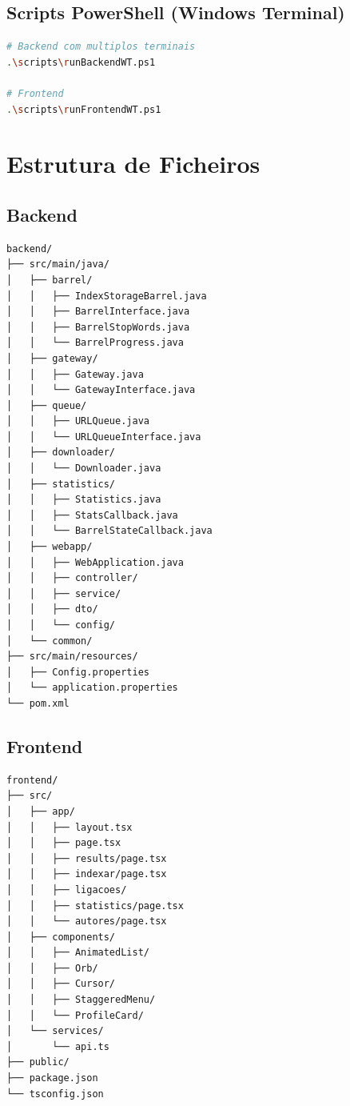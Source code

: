\documentclass[12pt,a4paper]{article}
\begin{document}
\subsection{Scripts PowerShell (Windows Terminal)}
\begin{lstlisting}[language=bash]
# Backend com multiplos terminais
.\scripts\runBackendWT.ps1

# Frontend
.\scripts\runFrontendWT.ps1
\end{lstlisting}

\section{Estrutura de Ficheiros}

\subsection{Backend}
\begin{lstlisting}
backend/
├── src/main/java/
│   ├── barrel/
│   │   ├── IndexStorageBarrel.java
│   │   ├── BarrelInterface.java
│   │   ├── BarrelStopWords.java
│   │   └── BarrelProgress.java
│   ├── gateway/
│   │   ├── Gateway.java
│   │   └── GatewayInterface.java
│   ├── queue/
│   │   ├── URLQueue.java
│   │   └── URLQueueInterface.java
│   ├── downloader/
│   │   └── Downloader.java
│   ├── statistics/
│   │   ├── Statistics.java
│   │   ├── StatsCallback.java
│   │   └── BarrelStateCallback.java
│   ├── webapp/
│   │   ├── WebApplication.java
│   │   ├── controller/
│   │   ├── service/
│   │   ├── dto/
│   │   └── config/
│   └── common/
├── src/main/resources/
│   ├── Config.properties
│   └── application.properties
└── pom.xml
\end{lstlisting}

\subsection{Frontend}
\begin{lstlisting}
frontend/
├── src/
│   ├── app/
│   │   ├── layout.tsx
│   │   ├── page.tsx
│   │   ├── results/page.tsx
│   │   ├── indexar/page.tsx
│   │   ├── ligacoes/
│   │   ├── statistics/page.tsx
│   │   └── autores/page.tsx
│   ├── components/
│   │   ├── AnimatedList/
│   │   ├── Orb/
│   │   ├── Cursor/
│   │   ├── StaggeredMenu/
│   │   └── ProfileCard/
│   └── services/
│       └── api.ts
├── public/
├── package.json
└── tsconfig.json
\end{lstlisting}
\end{document}
